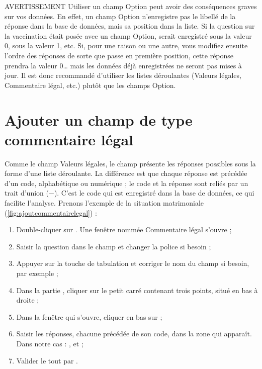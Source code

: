 \begin{mybox}[colbacktitle=CAUTION]{\faFire{} AVERTISSEMENT}
	Utiliser un champ Option peut avoir des conséquences graves sur vos données.
	En effet, un champ Option n'enregistre pas le libellé de la réponse dans la base de données, mais sa position dans la liste. Si la question sur la vaccination était posée avec un champ Option,  serait enregistré sous la valeur 0,  sous la valeur 1, etc.
	Si, pour une raison ou une autre, vous modifiez ensuite l'ordre des réponses de sorte que  passe en première position, cette réponse prendra la valeur 0\ldots{} mais les données déjà enregistrées ne seront pas mises à jour.
	Il est donc recommandé d'utiliser les listes déroulantes (Valeurs légales, Commentaire légal, etc.) plutôt que les champs Option.
\end{mybox}

\section{Ajouter un champ de type commentaire légal}
\label{sec:commentaireLegal}

Comme le champ Valeurs légales, le champ  présente les réponses possibles sous la forme d'une liste déroulante. La différence est que chaque réponse est précédée d'un code, alphabétique ou numérique ; le code et la réponse sont reliés par un trait d'union (\textcolor{IMPORTANT}{$-$}). C'est le code qui est enregistré dans la base de données, ce qui facilite l'analyse. Prenons l'exemple de la situation matrimoniale (\autoref{fig:ajoutcommentairelegal}) :

\begin{enumerate}
	\item Double-cliquer sur . Une fenêtre nommée Commentaire légal s'ouvre ;
	\item Saisir la question dans le champ  et changer la police si besoin ;
	\item Appuyer sur la touche de tabulation et corriger le nom du champ si besoin, par exemple  ;
	\item Dans la partie , cliquer sur le petit carré contenant trois points, situé en bas à droite ;
	\item Dans la fenêtre  qui s'ouvre, cliquer en bas sur  ;
	\item Saisir les réponses, chacune précédée de son code, dans la zone qui apparaît. Dans notre cas : ,  et  ;
	\item Valider le tout par .
\end{enumerate}

